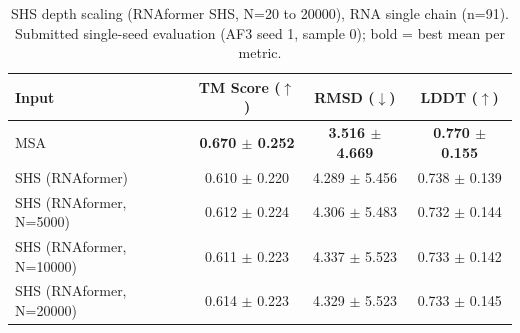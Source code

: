 \begin{table}[htbp]
\centering
\caption{SHS depth scaling (RNAformer SHS, N=20 to 20000), RNA single chain (n=91). Submitted single-seed evaluation (AF3 seed 1, sample 0); bold = best mean per metric.}
\label{tab:rna_single_chain_scaling}
\begin{tabular}{lccc}
\toprule
Input & TM Score ($\uparrow$) & RMSD ($\downarrow$) & LDDT ($\uparrow$) \\
\midrule
MSA & \textbf{0.670 $\pm$ 0.252} & \textbf{3.516 $\pm$ 4.669} & \textbf{0.770 $\pm$ 0.155} \\
SHS (RNAformer) & 0.610 $\pm$ 0.220 & 4.289 $\pm$ 5.456 & 0.738 $\pm$ 0.139 \\
SHS (RNAformer, N=5000) & 0.612 $\pm$ 0.224 & 4.306 $\pm$ 5.483 & 0.732 $\pm$ 0.144 \\
SHS (RNAformer, N=10000) & 0.611 $\pm$ 0.223 & 4.337 $\pm$ 5.523 & 0.733 $\pm$ 0.142 \\
SHS (RNAformer, N=20000) & 0.614 $\pm$ 0.223 & 4.329 $\pm$ 5.523 & 0.733 $\pm$ 0.145 \\
\bottomrule
\end{tabular}
\end{table}
